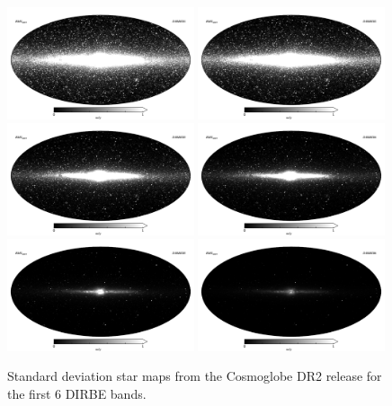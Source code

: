 \documentclass{aa}
\begin{document}
\begin{figure}
  \centering
  \includegraphics[width=0.49\textwidth]{figs/starmaps/stars_std_01.pdf}
  \includegraphics[width=0.49\textwidth]{figs/starmaps/stars_std_02.pdf} \\
  \includegraphics[width=0.49\textwidth]{figs/starmaps/stars_std_03.pdf}
  \includegraphics[width=0.49\textwidth]{figs/starmaps/stars_std_04.pdf} \\
  \includegraphics[width=0.49\textwidth]{figs/starmaps/stars_std_05.pdf}
  \includegraphics[width=0.49\textwidth]{figs/starmaps/stars_std_06.pdf} \\
  \caption{Standard deviation star maps from the Cosmoglobe DR2 release for the first 6 DIRBE bands. }
  \label{fig:starsstd}
\end{figure}
\end{document}
